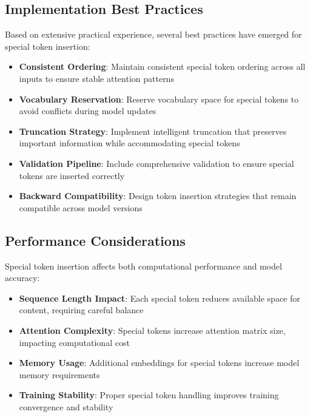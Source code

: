 \subsection{Implementation Best Practices}

Based on extensive practical experience, several best practices have emerged for special token insertion:

\begin{itemize}
\item \textbf{Consistent Ordering}: Maintain consistent special token ordering across all inputs to ensure stable attention patterns
\item \textbf{Vocabulary Reservation}: Reserve vocabulary space for special tokens to avoid conflicts during model updates
\item \textbf{Truncation Strategy}: Implement intelligent truncation that preserves important information while accommodating special tokens
\item \textbf{Validation Pipeline}: Include comprehensive validation to ensure special tokens are inserted correctly
\item \textbf{Backward Compatibility}: Design token insertion strategies that remain compatible across model versions
\end{itemize}
\begin{comment}
Feedback: This list of best practices is good, but a bit generic. It could be made more actionable. For example, for "Truncation Strategy," you could say: "Implement intelligent truncation (e.g., 'longest_first' for sentence pairs) that preserves important information while accommodating special tokens, rather than naively truncating from the end." For "Validation Pipeline," you could suggest: "Include a validation step that decodes a sample of tokenized inputs back to text to visually inspect that special tokens are inserted as expected."
\end{comment}

\subsection{Performance Considerations}

Special token insertion affects both computational performance and model accuracy:

\begin{itemize}
\item \textbf{Sequence Length Impact}: Each special token reduces available space for content, requiring careful balance
\item \textbf{Attention Complexity}: Special tokens increase attention matrix size, impacting computational cost
\item \textbf{Memory Usage}: Additional embeddings for special tokens increase model memory requirements
\item \textbf{Training Stability}: Proper special token handling improves training convergence and stability
\end{itemize}

